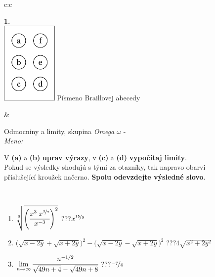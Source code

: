 \documentclass[10pt]{report}
\begin{document}
\begin{tabular}{c:c}
\begin{minipage}[c][104.5mm][t]{0.5\linewidth}
\begin{center}
\begin{minipage}{0.20\linewidth}
\begin{center}
{\Huge\bfseries 1.} \\[2mm]
\includegraphics[height=40mm]{../images/braille.png}
{\small Písmeno Braillovej abecedy}
\end{center}
\end{minipage}
\end{center}
\end{minipage}
&
\begin{minipage}[c][104.5mm][t]{0.5\linewidth}
\begin{center}
\vspace{7mm}
{\huge Odmocniny a limity, skupina \textit{Omega $\omega$} -}\\[5mm]
\textit{Meno:}\phantom{xxxxxxxxxxxxxxxxxxxxxxxxxxxxxxxxxxxxxxxxxxxxxxxxxxxxxxxxxxxxxxxxx}\\[5mm]
\begin{minipage}{0.95\linewidth}
\begin{center}
V \textbf{(a)} a \textbf{(b)} \textbf{uprav výrazy}, v \textbf{(c)} a \textbf{(d)} \textbf{vypočítaj limity}.\\Pokud se výsledky shodujú s tými za otazníky, tak napravo obarvi\\příslušející kroužek načerno. \textbf{Spolu odevzdejte výsledné slovo}.
\end{center}
\end{minipage}
\\[1mm]
\begin{minipage}{0.79\linewidth}
\begin{center}
\begin{varwidth}{\linewidth}
\begin{enumerate}
\small
\item $\sqrt[8]{\left(\cfrac{x^{3}\;x^{\nicefrac{3}{2}}}{x^{-3}}\right)^{2}}$\quad \dotfill\; ???\;\dotfill \quad $x^{\nicefrac{15}{8}}$
\item {\footnotesize{\scriptsize$\big(\sqrt{x-2y}+\sqrt{x+2y}\big)^2-\big(\sqrt{x-2y}-\sqrt{x+2y}\big)^2$}\quad \dotfill\; ???\;\dotfill \quad $4\sqrt{x^2+2y^2}$}
\item $\lim\limits_{n\to\infty}\cfrac{n^{-1/2}}{\sqrt{49n+4}-\sqrt{49n+8}}$\quad \dotfill\; ???\;\dotfill \quad $\nicefrac{-7}{4}$

\end{enumerate}
\end{varwidth}
\end{center}
\end{minipage}
\end{center}
\end{minipage}
\end{tabular}
\end{document}

